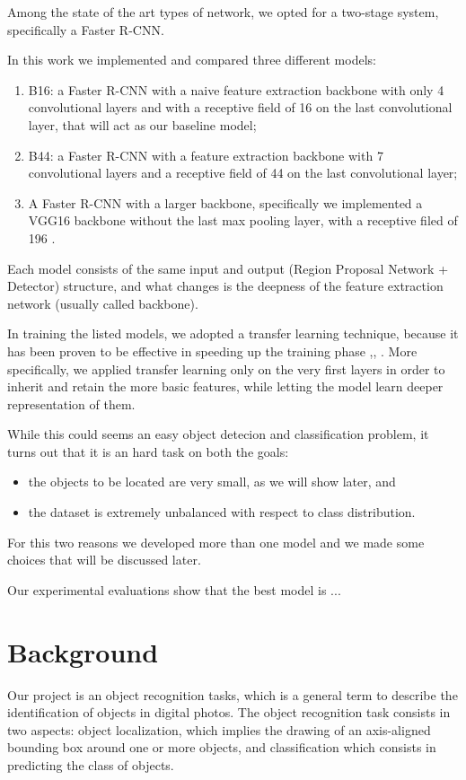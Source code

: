 \documentclass[a4paper,10pt]{report}
\begin{document}
Among the state of the art types of network, we opted for a two-stage system, specifically a Faster R-CNN.

In this work we implemented and compared three different models:
\begin{enumerate}
  \item B16: a Faster R-CNN with a naive feature extraction backbone with only 4 convolutional layers and with a receptive field of 16 on the last convolutional layer, that will act as our baseline model;
  \item B44: a Faster R-CNN with a feature extraction backbone with 7 convolutional layers and a receptive field of 44 on the last convolutional layer;
  \item A Faster R-CNN with a larger backbone, specifically we implemented a VGG16 backbone without the last max pooling layer, with a receptive filed of 196 \cite{vgg}.
\end{enumerate}
Each model consists of the same input and output (Region Proposal Network + Detector) structure, and what changes is the deepness of the feature extraction network (usually called backbone).

In training the listed models, we adopted a transfer learning technique, because it has been proven to be effective in speeding up the training phase \cite{claran},\cite{transfer-learning-1}, \cite{transfer-learning-2}.
More specifically, we applied transfer learning only on the very first layers in order to inherit and retain the more basic features, while letting the model learn deeper representation of them.

While this could seems an easy object detecion and classification problem, it turns out that it is an hard task on both the goals:
\begin{itemize}
  \item the objects to be located are very small, as we will show later, and
  \item the dataset is extremely unbalanced with respect to class distribution.
\end{itemize}

For this two reasons we developed more than one model and we made some choices that will be discussed later.

Our experimental evaluations show that the best model is  ...

\chapter{Background}\label{chap:background}
Our project is an object recognition tasks, which is a general term to describe the identification of objects
in digital photos. 
The object recognition task consists in two aspects: object localization, which implies the drawing of an 
axis-aligned  bounding box around one or more objects, and classification which consists in predicting the class 
of objects.
\end{document}
